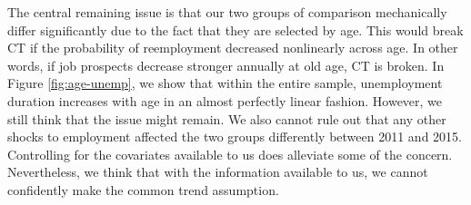 \documentclass{scrartcl}
\begin{document}
\begin{itemize}[label=$\blacktriangleright$]
    The central remaining issue is that our two groups of comparison mechanically differ significantly due to the fact that they are selected by age. This would break CT if the probability of reemployment decreased nonlinearly across age. In other words, if job prospects decrease stronger annually at old age, CT is broken. In Figure \ref{fig:age-unemp}, we show that within the entire sample, unemployment duration increases with age in an almost perfectly linear fashion. However, we still think that the issue might remain. We also cannot rule out that any other shocks to employment affected the two groups differently between 2011 and 2015. Controlling for the covariates available to us does alleviate some of the concern. Nevertheless, we think that with the information available to us, we cannot confidently make the common trend assumption.


\end{itemize}
\end{document}
